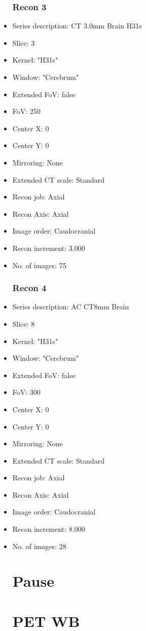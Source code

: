 \documentclass[12pt]{article}
\begin{document}
\begin{itemize}
\subsubsection{Recon 3}
\item Series description: CT 3.0mm  Brain H31s
\item Slice: 3
\item Kernel: "H31s"
\item Window: "Cerebrum"
\item Extended FoV: false
\item FoV: 250
\item Center X: 0
\item Center Y: 0
\item Mirroring: None
\item Extended CT scale: Standard
\item Recon job: Axial
\item Recon Axis: Axial
\item Image order: Caudocranial
\item Recon increment: 3.000
\item No. of images: 75
\subsubsection{Recon 4}
\item Series description: AC CT8mm Brain
\item Slice: 8
\item Kernel: "H31s"
\item Window: "Cerebrum"
\item Extended FoV: false
\item FoV: 300
\item Center X: 0
\item Center Y: 0
\item Mirroring: None
\item Extended CT scale: Standard
\item Recon job: Axial
\item Recon Axis: Axial
\item Image order: Caudocranial
\item Recon increment: 8.000
\item No. of images: 28
\section{Pause}

\section{PET WB}

\end{itemize}
\end{document}
